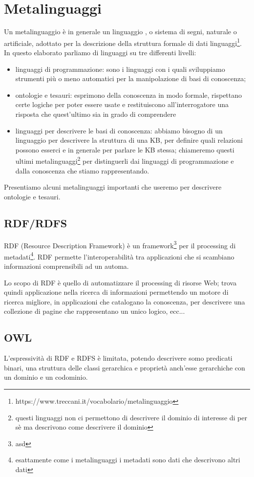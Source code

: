 \section{Metalinguaggi}
Un metalinguaggio è in generale un linguaggio , o sistema di segni, naturale o artificiale, adottato per la descrizione della struttura formale di dati linguaggi\footnote{https://www.treccani.it/vocabolario/metalinguaggio}. In questo elaborato parliamo di linguaggi su tre differenti livelli:
\begin{itemize}
	\item linguaggi di programmazione: sono i linguaggi con i quali sviluppiamo strumenti più o meno automatici per la manipolazione di basi di conoscenza;
	\item ontologie e tesauri: esprimono della conoscenza in modo formale, rispettano certe logiche per poter essere usate e restituiscono all'interrogatore una risposta che quest'ultimo sia in grado di comprendere
	\item linguaggi per descrivere le basi di conoscenza: abbiamo bisogno di un linguaggio per descrivere la struttura di una KB, per definire quali relazioni possono esserci e in generale per parlare le KB stessa; chiameremo questi ultimi metalinguaggi\footnote{questi linguaggi non ci permettono di descrivere il dominio di interesse di per sè ma descrivono come descrivere il dominio} per distinguerli dai linguaggi di programmazione e dalla conoscenza che stiamo rappresentando.
\end{itemize}
Presentiamo alcuni metalinguaggi importanti che useremo per descrivere ontologie e tesauri.
\subsection{RDF/RDFS}
RDF (Resource Description Framework) è un framework\footnote{asd} per il processing di metadati\footnote{esattamente come i metalinguaggi i metadati sono dati che descrivono altri dati}. RDF permette l'interoperabilità tra applicazioni che si scambiano informazioni comprensibili ad un automa.

Lo scopo di RDF è quello di automatizzare il processing di risorse Web; trova quindi applicazione nella ricerca di informazioni permettendo un motore di ricerca migliore, in applicazioni che catalogano la conoscenza, per descrivere una collezione di pagine che rappresentano un unico  logico, ecc...\cite{brickley1998resource}
\subsection{OWL}
L'espressività di RDF e RDFS è limitata, potendo descrivere somo predicati binari, una struttura delle classi gerarchica e proprietà anch'esse gerarchiche con un dominio e un codominio.

